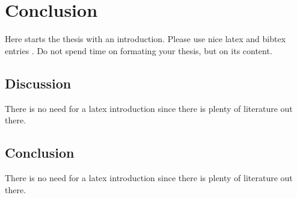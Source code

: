 \chapter{Conclusion}
\label{chapter:Conclusion}



Here starts the thesis with an introduction. Please use nice latex and bibtex entries \cite{latex}. Do not spend time on formating your thesis, but on its content. 
 
\section{Discussion}
There is no need for a latex introduction since there is plenty of literature out there.
 

\section{Conclusion}
There is no need for a latex introduction since there is plenty of literature out there.


